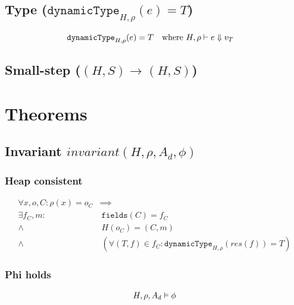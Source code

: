 \documentclass[11pt,a4paper]{article}
\begin{document}
\subsection{Type ($\texttt{dynamicType}_{H,\rho}(e) = T$)}
\begin{align*}
&\texttt{dynamicType}_{H,\rho}(e) = T ~~\text{ where } H,\rho \vdash e \Downarrow v_T  
\end{align*}

\newcommand{\sstepGeneric}[5]{({#1}, {#2}) \rightarrow^{#3} ({#4}, {#5})}
\newcommand{\sstep}[4]{\sstepGeneric {#1} {#2} {} {#3} {#4}}
\newcommand{\sstepM}[4]{\sstepGeneric {#1} {#2} * {#3} {#4}} 
\newcommand{\sstepWS}[4]{\sstepGeneric {#1} {{#2} \cdot S} {} {#3} {{#4} \cdot S}}
\newcommand{\sstepWSX}[8]{\sstepGeneric {#1} {({#2},{#3},{#4}) \cdot S} {} {#5} {({#6},{#7},{#8}) \cdot S}}

\newcommand{\Tfs}{\overline{T}~\overline{f}}
\subsection{Small-step ($\sstep H S H S$)}


\section{Theorems}
\subsection{Invariant $invariant(H, \rho, A_d, \phi)$}
\subsubsection{Heap consistent}
\begin{align*}
\forall x, o, C : 
	\rho(x) = o_C &\implies\\
      \exists f_C, m :&~ 
        \texttt{fields}(C) = f_C \\
      \wedge&~ H(o_C) = (C, m) \\
      \wedge&~(\forall (T, f) \in f_C : \texttt{dynamicType}_{H,\rho}(res(f)) = T)
\end{align*}

\subsubsection{Phi holds}
\begin{align*}
    H,\rho,A_d \vDash \phi
\end{align*}
\end{document}
